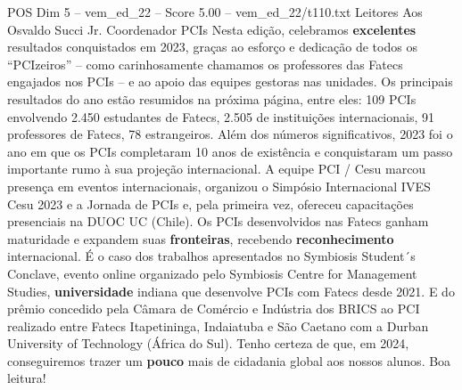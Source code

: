\begin{textsample}{POS Dim 5 – vem\_ed\_22 – Score 5.00 – vem\_ed\_22/t110.txt}  \label{ex:f5_pos_092}
Leitores Aos Osvaldo Succi Jr.
Coordenador PCIs Nesta edição, celebramos \textbf{excelentes} resultados conquistados em 2023, graças ao esforço e dedicação de todos os “PCIzeiros” – como carinhosamente chamamos os professores das Fatecs engajados nos PCIs – e ao apoio das equipes gestoras nas unidades.
Os principais resultados do ano estão resumidos na próxima página, entre eles: 109 PCIs envolvendo 2.450 estudantes de Fatecs, 2.505 de instituições internacionais, 91 professores de Fatecs, 78 estrangeiros.
Além dos números significativos, 2023 foi o ano em que os PCIs completaram 10 anos de existência e conquistaram um passo importante rumo à sua projeção internacional.
A equipe PCI / Cesu marcou presença em eventos internacionais, organizou o Simpósio Internacional IVES Cesu 2023 e a Jornada de PCIs e, pela primeira vez, ofereceu capacitações presenciais na DUOC UC (Chile).
Os PCIs desenvolvidos nas Fatecs ganham maturidade e expandem suas \textbf{fronteiras}, recebendo \textbf{reconhecimento} internacional.
É o caso dos trabalhos apresentados no Symbiosis Student´s Conclave, evento online organizado pelo Symbiosis Centre for Management Studies, \textbf{universidade} indiana que desenvolve PCIs com Fatecs desde 2021.
E do prêmio concedido pela Câmara de Comércio e Indústria dos BRICS ao PCI realizado entre Fatecs Itapetininga, Indaiatuba e São Caetano com a Durban University of Technology (África do Sul).
Tenho certeza de que, em 2024, conseguiremos trazer um \textbf{pouco} mais de cidadania global aos nossos alunos.
Boa leitura!

\end{textsample}
